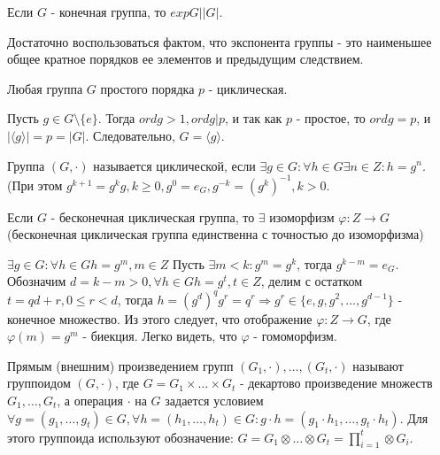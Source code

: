 \begin{sledsv}
  Если $G$ - конечная группа, то $exp G | |G|$.
  \begin{dokvo}
    Достаточно воспользоваться фактом, что экспонента группы - это наименьшее общее кратное порядков ее элементов и
    предыдущим следствием.
  \end{dokvo}
\end{sledsv}

\begin{sledsv}
  Любая группа $G$ простого порядка $p$ - циклическая.
  \begin{dokvo}
    Пусть $g \in G \setminus \{e\}$. Тогда $ord g > 1, ord g | p$, и так как $p$ - простое,
    то $ord g = p$, и $|\langle g \rangle| = p = |G|$. Следовательно, $G = \langle g \rangle$.
  \end{dokvo}
\end{sledsv}

\begin{defs}
  Группа $(G,\cdot)$ называется циклической, если $\exists g \in G : \forall h \in G \exists n \in Z : h = g^n$.
  (При этом $g^{k+1} = g^kg, k \geqslant 0, g^0 = e_G, g^{-k} = (g^k)^{-1}, k > 0$.
\end{defs}

\begin{proofs}
	Если $G$ - бесконечная циклическая группа, то $\exists$ изоморфизм $\varphi : Z \to G$
  (бесконечная циклическая группа единственна с точностью до изоморфизма)
	\begin{dokvo}
    $\exists g \in G : \forall h \in G h = g^m, m \in Z$
    Пусть $\exists m < k : g^m = g^k$, тогда $g^{k-m} = e_G$.
    Обозначим $d=k-m > 0, \forall h \in G h = g^t, t \in Z$, делим с остатком
    $t = qd + r, 0 \leqslant r < d$, тогда $h=(g^d)^qg^r=q^r \Rightarrow g^r \in \{e, g, g^2, \ldots, g^{d-1}\}$ -
    конечное множество. Из этого следует, что отображение $\varphi : Z \to G$, где $\varphi(m)=g^m$ - биекция.
    Легко видеть, что $\varphi$ - гомоморфизм.
	\end{dokvo}
\end{proofs}

\begin{defs}
  Прямым (внешним) произведением групп $(G_1,\cdot), \ldots, (G_t, \cdot)$ называют группоидом $(G,\cdot)$, где
  $G = G_1 \times \ldots \times G_t$ - декартово произведение множеств $G_1, \ldots, G_t$, а операция $\cdot$ на $G$ задается
  условием $\forall g = (g_1, \ldots, g_t) \in G, \forall h = (h_1, \ldots, h_t) \in G : g \cdot h = (g_1 \cdot h_1, \ldots, g_t \cdot h_t)$.
  Для этого группоида используют обозначение: $G = G_1 \otimes \ldots \otimes G_t = \prod_{i=1}^{t} \otimes G_i$.
\end{defs}

